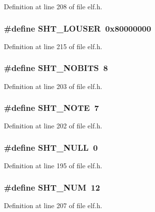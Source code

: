 Definition at line 208 of file elf.h.
\subsubsection[{SHT\_\-LOUSER}]{\setlength{\rightskip}{0pt plus 5cm}\#define SHT\_\-LOUSER~0x80000000}\label{elf_8h_65191e50120fb55adb41cce8ee010915}




Definition at line 215 of file elf.h.
\subsubsection[{SHT\_\-NOBITS}]{\setlength{\rightskip}{0pt plus 5cm}\#define SHT\_\-NOBITS~8}\label{elf_8h_820ff00317949be2ea1fd634a17dc13e}




Definition at line 203 of file elf.h.
\subsubsection[{SHT\_\-NOTE}]{\setlength{\rightskip}{0pt plus 5cm}\#define SHT\_\-NOTE~7}\label{elf_8h_65506a79f0e972c851851af7b1008d94}




Definition at line 202 of file elf.h.
\subsubsection[{SHT\_\-NULL}]{\setlength{\rightskip}{0pt plus 5cm}\#define SHT\_\-NULL~0}\label{elf_8h_1566f4c14cff9f4b539b00af54d62dbb}




Definition at line 195 of file elf.h.
\subsubsection[{SHT\_\-NUM}]{\setlength{\rightskip}{0pt plus 5cm}\#define SHT\_\-NUM~12}\label{elf_8h_25749e57904d1af1528ae9fa5a395855}




Definition at line 207 of file elf.h.
